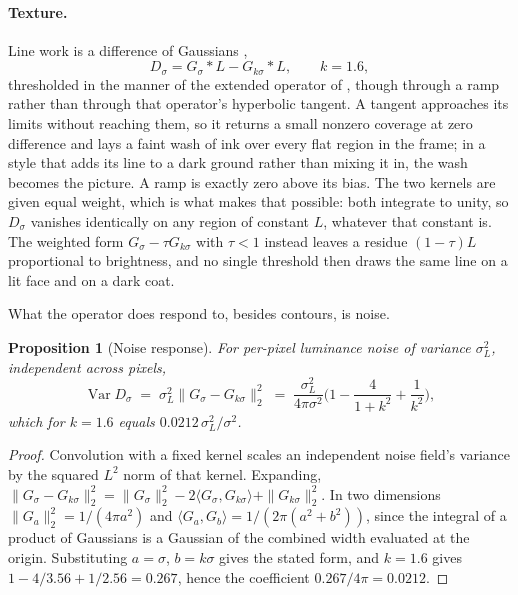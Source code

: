 \documentclass{article}
\newtheorem{proposition}{Proposition}
\theoremstyle{definition}
\begin{document}
\paragraph{Texture.}
Line work is a difference of Gaussians \citep{marr1980edge},
\begin{equation}
  \label{eq:dog}
  D_\sigma = G_\sigma * L - G_{k\sigma} * L, \qquad k = 1.6,
\end{equation}
thresholded in the manner of the extended operator of
\citet{winnemoller2012xdog}, though through a ramp rather than through that
operator's hyperbolic tangent. A tangent approaches its limits without reaching
them, so it returns a small nonzero coverage at zero difference and lays a faint
wash of ink over every flat region in the frame; in a style that adds its line to
a dark ground rather than mixing it in, the wash becomes the picture. A ramp is
exactly zero above its bias. The two kernels are given equal weight, which is
what makes that possible: both integrate to unity, so $D_\sigma$ vanishes
identically on any region of constant $L$, whatever that constant is.
The weighted form $G_\sigma - \tau G_{k\sigma}$ with $\tau<1$ instead leaves a
residue $(1-\tau)L$ proportional to brightness, and no single threshold then
draws the same line on a lit face and on a dark coat.

What the operator does respond to, besides contours, is noise.

\begin{proposition}[Noise response]
\label{prop:dognoise}
For per-pixel luminance noise of variance $\sigma_L^2$, independent across
pixels,
\[
  \operatorname{Var} D_\sigma \;=\; \sigma_L^2 \|G_\sigma - G_{k\sigma}\|_2^2
  \;=\; \frac{\sigma_L^2}{4\pi\sigma^2}\Big(1 - \frac{4}{1+k^2} + \frac{1}{k^2}\Big),
\]
which for $k = 1.6$ equals $0.0212\,\sigma_L^2/\sigma^2$.
\end{proposition}

\begin{proof}
Convolution with a fixed kernel scales an independent noise field's variance by
the squared $L^2$ norm of that kernel. Expanding,
$\|G_\sigma - G_{k\sigma}\|_2^2 = \|G_\sigma\|_2^2 - 2\langle G_\sigma,G_{k\sigma}\rangle + \|G_{k\sigma}\|_2^2$.
In two dimensions $\|G_a\|_2^2 = 1/(4\pi a^2)$ and
$\langle G_a, G_b\rangle = 1/(2\pi(a^2+b^2))$, since the integral of a product of
Gaussians is a Gaussian of the combined width evaluated at the origin.
Substituting $a=\sigma$, $b=k\sigma$ gives the stated form, and $k=1.6$ gives
$1 - 4/3.56 + 1/2.56 = 0.267$, hence the coefficient $0.267/4\pi = 0.0212$.
\end{proof}
\end{document}
